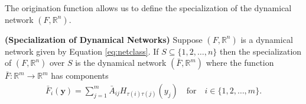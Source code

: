 \documentclass[12pt]{thesis}
\begin{document}
The origination function allows us to define the specialization of the dynamical network $(F,\mathbb{R}^n)$.

\begin{definition}\label{def:specdyn}\textbf{(Specialization of Dynamical Networks)} 
Suppose $(F,\mathbb{R}^n)$ is a dynamical network given by Equation \eqref{eq:netclass}.
If $S\subseteq \{1,2,\dots,n\}$ then the {specialization} of $(F,\mathbb{R}^n)$ over $S$ is the dynamical network $(\bar{F},\mathbb{R}^m)$ where the function $\bar{F}:\mathbb{R}^m\rightarrow\mathbb{R}^m$ has components
\begin{align*}
    \bar{F}_i(\mathbf{y})=\sum_{j=1}^m \bar{A}_{ij}H_{\tau(i)\tau(j)}(y_j) \quad \text{for} \quad i\in \{1,2,\dots,m\}.
\end{align*}
\end{definition}
\end{document}
